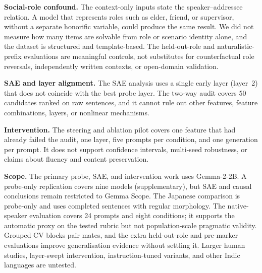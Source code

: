 \documentclass[11pt]{article}
\begin{document}
\textbf{Social-role confound.} The context-only inputs state the
speaker--addressee relation. A model that represents roles such as elder,
friend, or supervisor, without a separate honorific variable, could produce the
same result. We did not measure how many items are solvable from role or
scenario identity alone, and the dataset is structured and template-based. The
held-out-role and naturalistic-prefix evaluations are meaningful controls, not
substitutes for counterfactual role reversals, independently written contexts,
or open-domain validation.

\textbf{SAE and layer alignment.} The SAE analysis uses a single early layer
(layer~2) that does not coincide with the best probe layer. The two-way audit
covers 50 candidates ranked on raw sentences, and it cannot rule out other
features, feature combinations, layers, or nonlinear mechanisms.

\textbf{Intervention.} The steering and ablation pilot covers one feature that
had already failed the audit, one layer, five prompts per condition, and one
generation per prompt. It does not support confidence intervals, multi-seed
robustness, or claims about fluency and content preservation.

\textbf{Scope.} The primary probe, SAE, and intervention work uses Gemma-2-2B.
A probe-only replication covers nine models (supplementary), but SAE and causal
conclusions remain restricted to Gemma Scope. The Japanese comparison is
probe-only and uses completed sentences with regular morphology. The
native-speaker evaluation covers 24 prompts and eight conditions; it supports
the automatic proxy on the tested rubric but not population-scale pragmatic
validity. Grouped CV blocks pair mates, and the extra held-out-role and
pre-marker evaluations improve generalisation evidence without settling it.
Larger human studies, layer-swept intervention, instruction-tuned variants, and
other Indic languages are untested.

\raggedbottom

\end{document}
